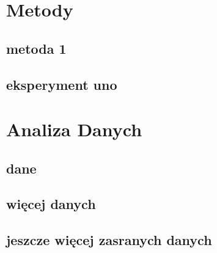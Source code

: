 \documentclass[12pt, a4paper]{article}
\begin{document}


\section{Metody}\label{sec:methods}
\subsection{metoda 1}
\lipsum[2]
\subsection{eksperyment uno}
\lipsum[3-5]

\section{Analiza Danych}\label{sec:analysis}
\subsection{dane}
\lipsum[2-4]
\subsection{więcej danych}
\lipsum[2-4]
\subsection{jeszcze więcej zasranych danych}
\lipsum[2-4]



\end{document}

